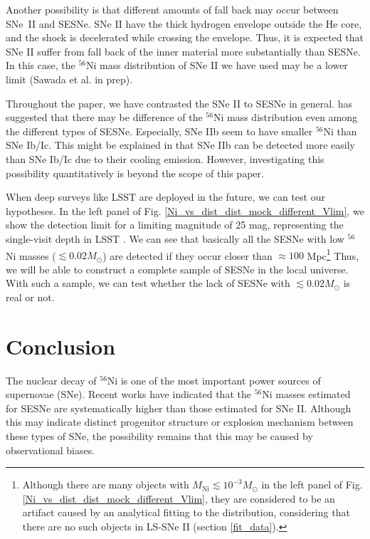\documentclass[twocolumn, linenumbers]{aastex62}
\begin{document}
Another possibility is that different amounts of fall back may occur between SNe~II and SESNe. SNe II have the thick hydrogen envelope outside the He core, and the shock is decelerated while crossing the envelope. Thus, it is expected that SNe II suffer from fall back of the inner material more substantially than SESNe. In this case, the $^{56}$Ni mass distribution of SNe II we have used may be a lower limit (Sawada et al. in prep). 



Throughout the paper, we have contrasted the SNe II to SESNe in general. \citet{2019A&A...628A...7A} has suggested that there may be difference of the $^{56}$Ni mass distribution even among the different types of SESNe. Especially, SNe IIb seem to have smaller $^{56}$Ni than SNe Ib/Ic. This might be explained in that SNe IIb can be detected more easily than SNe Ib/Ic due to their cooling emission. However, investigating this possibility quantitatively is beyond the scope of this paper.

When deep surveys like LSST are deployed in the future, we can test our hypotheses. In the left panel of Fig. \ref{Ni_vs_dist_dist_mock_different_Vlim}, we show the detection limit for a limiting magnitude of 25 mag, representing the single-visit depth in LSST \citep{2019ApJ...873..111I}. We can see that basically all the SESNe with low $^{56}$Ni masses  ($\lesssim 0.02 M_{\odot}$) are detected if they occur closer than $\approx 100$ Mpc\footnote{Although there are many objects with $M_{\mathrm{Ni}} \lesssim 10^{-3} M_{\odot}$ in the left panel of Fig.\ref{Ni_vs_dist_dist_mock_different_Vlim}, they are considered to be an artifact caused by an analytical fitting to the distribution, considering that there are no such objects in LS-SNe II (section \ref{fit_data}).} Thus, we will be able to construct a complete sample of SESNe in the local universe. With such a sample, we can test whether the lack of SESNe with $\lesssim 0.02 M_{\odot}$ is real or not.



\section{Conclusion} \label{sec:conclusion}
The nuclear decay of $^{56}$Ni is one of the most important power sources of supernovae (SNe). Recent works have indicated that the $^{56}$Ni masses estimated for SESNe are systematically higher than those estimated for SNe II. Although this may indicate distinct progenitor structure or explosion mechanism between these types of SNe, the possibility remains that this may be caused by observational biases. 
\end{document}
